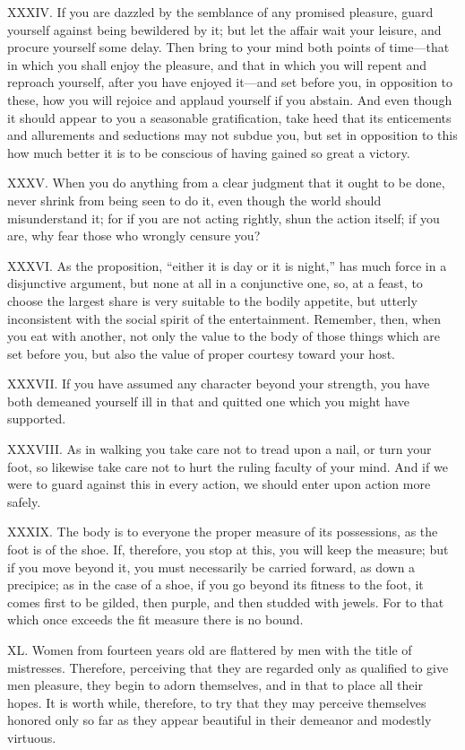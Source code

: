 \documentclass[a4paper]{article}
\begin{document}
XXXIV. If you are dazzled by the semblance of any promised pleasure, guard
yourself against being bewildered by it; but let the affair wait your
leisure, and procure yourself some delay. Then bring to your mind both
points of time—that in which you shall enjoy the pleasure, and that in
which you will repent and reproach yourself, after you have enjoyed
it—and set before you, in opposition to these, how you will rejoice and
applaud yourself if you abstain. And even though it should appear to you
a seasonable gratification, take heed that its enticements and
allurements and seductions may not subdue you, but set in opposition to
this how much better it is to be conscious of having gained so great a
victory.


XXXV. When you do anything from a clear judgment that it ought to be done,
never shrink from being seen to do it, even though the world should
misunderstand it; for if you are not acting rightly, shun the action
itself; if you are, why fear those who wrongly censure you?


XXXVI. As the proposition, “either it is day or it is night,” has much force in
a disjunctive argument, but none at all in a conjunctive one, so, at a
feast, to choose the largest share is very suitable to the bodily
appetite, but utterly inconsistent with the social spirit of the
entertainment. Remember, then, when you eat with another, not only the
value to the body of those things which are set before you, but also the
value of proper courtesy toward your host.


XXXVII. If you have assumed any character beyond your strength, you have both
demeaned yourself ill in that and quitted one which you might have
supported.


XXXVIII. As in walking you take care not to tread upon a nail, or turn your foot,
so likewise take care not to hurt the ruling faculty of your mind. And if
we were to guard against this in every action, we should enter upon
action more safely.


XXXIX. The body is to everyone the proper measure of its possessions, as the
foot is of the shoe. If, therefore, you stop at this, you will keep the
measure; but if you move beyond it, you must necessarily be carried
forward, as down a precipice; as in the case of a shoe, if you go beyond
its fitness to the foot, it comes first to be gilded, then purple, and
then studded with jewels. For to that which once exceeds the fit measure
there is no bound.


XL. Women from fourteen years old are flattered by men with the title of
mistresses. Therefore, perceiving that they are regarded only as
qualified to give men pleasure, they begin to adorn themselves, and in
that to place all their hopes. It is worth while, therefore, to try that
they may perceive themselves honored only so far as they appear beautiful
in their demeanor and modestly virtuous.
\end{document}
